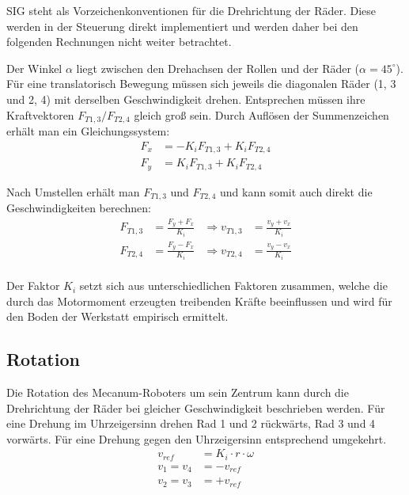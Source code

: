 \documentclass[a4paper]{article}
\begin{document}
SIG steht als Vorzeichenkonventionen für die Drehrichtung der Räder. Diese werden in der Steuerung direkt implementiert und werden daher bei den folgenden Rechnungen nicht weiter betrachtet.

Der Winkel $ \alpha $ liegt zwischen den Drehachsen der Rollen und der Räder ($\alpha = 45^\circ$).
Für eine translatorisch Bewegung müssen sich jeweils die diagonalen Räder (1, 3 und 2, 4) mit derselben Geschwindigkeit drehen. Entsprechen müssen ihre Kraftvektoren $F_{T1, 3} / F_{T2, 4}$ gleich groß sein.
Durch Auflösen der Summenzeichen erhält man ein Gleichungssystem:
\begin{align*}
    F_x &= - K_i F_{T1, 3} + K_i F_{T2, 4} \\
    F_y &= K_i F_{T1, 3}   + K_i F_{T2, 4}
\end{align*}

Nach Umstellen erhält man $F_{T1, 3}$ und $F_{T2, 4}$ und kann somit auch direkt die Geschwindigkeiten berechnen:
\begin{align*}
    F_{T1, 3} &= \frac{F_y + F_x}{K_i} &\Rightarrow v_{T1, 3} &= \frac{v_y + v_x}{K_i} \\
    F_{T2, 4} &= \frac{F_y - F_x}{K_i} &\Rightarrow v_{T2, 4} &= \frac{v_y - v_x}{K_i} \\
\end{align*}

Der Faktor $K_i$ setzt sich aus unterschiedlichen Faktoren zusammen, welche die durch das Motormoment erzeugten treibenden Kräfte beeinflussen und wird für den Boden der Werkstatt empirisch ermittelt.


\subsection{Rotation}
Die Rotation des Mecanum-Roboters um sein Zentrum kann durch die Drehrichtung der Räder bei gleicher Geschwindigkeit beschrieben werden.
Für eine Drehung im Uhrzeigersinn drehen Rad 1 und 2 rückwärts, Rad 3 und 4 vorwärts. Für eine Drehung gegen den Uhrzeigersinn entsprechend umgekehrt.
\begin{align*}
    v_{ref} &= K_i \cdot r \cdot \omega \\
    v_1 = v_4 &= - v_{ref}              \\
    v_2 = v_3 &= + v_{ref}
\end{align*}


\end{document}
